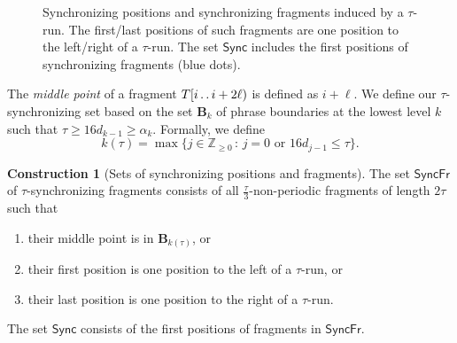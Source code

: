 \documentclass[a4paper]{article}
\theoremstyle{definition}
\newtheorem{construction}[theorem]{Construction}
\theoremstyle{remark}
\newcommand{\Zz}{\mathbb{Z}_{\ge 0}}
\newcommand{\B}{\mathbf{B}}
\newcommand{\dd}{\mathinner{\ldotp\ldotp}}
\renewcommand{\S}{\mathsf{Sync}}
\renewcommand{\S}{\mathsf{Sync}}
\newcommand{\SF}{\mathsf{SyncFr}}
\begin{document}
\begin{figure}[h]
\centering
{}
 \caption{Synchronizing positions and synchronizing fragments induced by a $\tau$-run.
The first/last positions of such fragments are one position to the left/right of a $\tau$-run. The set $\S$ includes the first positions
of synchronizing fragments (blue dots).}\label{Sept23}
\end{figure}

The \emph{middle point} of a fragment $T[i \dd i+2\ell)$ is defined as $i+\ell$. 
We define our $\tau$-synchronizing set based on the set $\B_k$ of phrase boundaries at the lowest level 
$k$ such that $\tau \ge 16d_{k-1} \ge \alpha_k$. Formally, we define \[k(\tau)=\max\{j \in \Zz\,:\, j=0 \text{ or }16d_{j-1} \le \tau\}.\]

\begin{construction}[Sets of synchronizing positions and fragments]\label{def:syncfr}
The set $\SF$ of $\tau$-synchronizing fragments consists of all $\frac{\tau}{3}$-non-periodic 
fragments of length $2\tau$ such that 
\begin{enumerate}[label=(\alph*)]
\item\label{it:a} their middle point is in $\B_{k(\tau)}$, or
\item\label{it:b} their first position is one position to the left of a $\tau$-run, or
\item\label{it:c} their last position is one position to the right of a $\tau$-run.
\end{enumerate}
The set $\S$ consists of the first positions
of fragments in $\SF$.
\end{construction}
\end{document}
